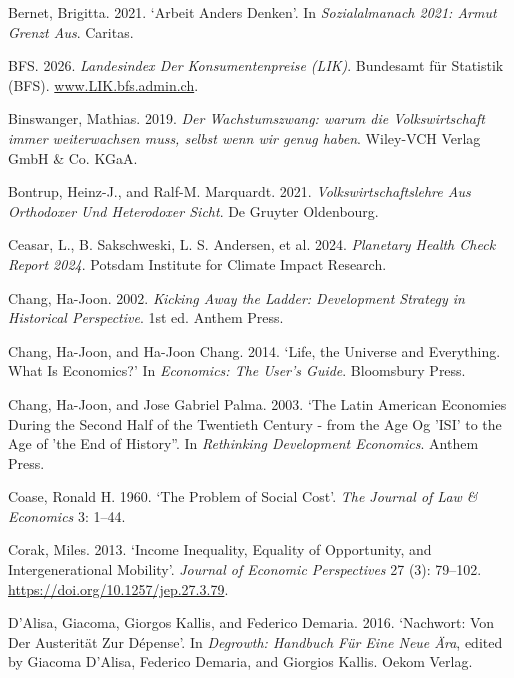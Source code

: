 \documentclass[
  british,
  a4paper,
  DIV=11,
  numbers=noendperiod,
  oneside,
  openany]{scrreprt}
\newlength{\cslhangindent}
\newenvironment{CSLReferences}[2] %
 {\begin{list}{}{%
  \setlength{\itemindent}{0pt}
  \setlength{\leftmargin}{0pt}
  \setlength{\parsep}{0pt}
  \ifodd #1
   \setlength{\leftmargin}{\cslhangindent}
   \setlength{\itemindent}{-1\cslhangindent}
  \fi
  \setlength{\itemsep}{#2\baselineskip}}}
 {\end{list}}
\begin{document}
\begin{CSLReferences}{1}{1}
Bernet, Brigitta. 2021. {`Arbeit Anders Denken'}. In
\emph{Sozialalmanach 2021: Armut Grenzt Aus}. Caritas.

BFS. 2026. \emph{Landesindex Der {Konsumentenpreise} ({LIK})}. Bundesamt
für Statistik (BFS).
\href{https://www.LIK.bfs.admin.ch}{www.LIK.bfs.admin.ch}.

Binswanger, Mathias. 2019. \emph{Der Wachstumszwang: warum die
Volkswirtschaft immer weiterwachsen muss, selbst wenn wir genug haben}.
Wiley-VCH Verlag GmbH \& Co. KGaA.

Bontrup, Heinz-J., and Ralf-M. Marquardt. 2021.
\emph{Volkswirtschaftslehre Aus Orthodoxer Und Heterodoxer Sicht}. De
Gruyter Oldenbourg.

Ceasar, L., B. Sakschweski, L. S. Andersen, et al. 2024. \emph{Planetary
Health Check Report 2024}. Potsdam Institute for Climate Impact
Research.

Chang, Ha-Joon. 2002. \emph{Kicking Away the Ladder: Development
Strategy in Historical Perspective}. 1st ed. Anthem Press.

Chang, Ha-Joon, and Ha-Joon Chang. 2014. {`Life, the Universe and
Everything. What Is Economics?'} In \emph{Economics: The User's Guide}.
Bloomsbury Press.

Chang, Ha-Joon, and Jose Gabriel Palma. 2003. {`The Latin American
Economies During the Second Half of the Twentieth Century - from the Age
Og 'ISI' to the Age of 'the End of History''}. In \emph{Rethinking
Development Economics}. Anthem Press.

Coase, Ronald H. 1960. {`The Problem of Social Cost'}. \emph{The Journal
of Law \& Economics} 3: 1--44.

Corak, Miles. 2013. {`Income {Inequality}, {Equality} of {Opportunity},
and {Intergenerational Mobility}'}. \emph{Journal of Economic
Perspectives} 27 (3): 79--102.
\url{https://doi.org/10.1257/jep.27.3.79}.

D'Alisa, Giacoma, Giorgos Kallis, and Federico Demaria. 2016.
{`Nachwort: {Von} Der {Austerität} Zur {Dépense}'}. In \emph{Degrowth:
{Handbuch} Für Eine Neue Ära}, edited by Giacoma D'Alisa, Federico
Demaria, and Giorgios Kallis. Oekom Verlag.


\end{CSLReferences}
\end{document}

